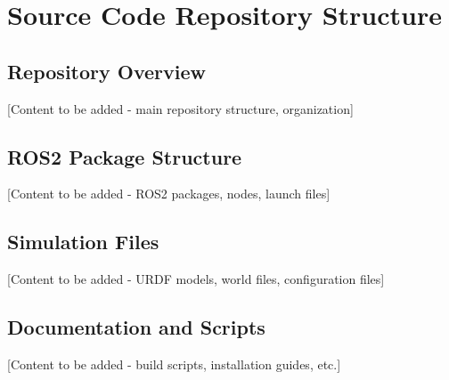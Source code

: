 
\chapter{Source Code Repository Structure}


\section{Repository Overview}

[Content to be added - main repository structure, organization]

\section{ROS2 Package Structure}

[Content to be added - ROS2 packages, nodes, launch files]

\section{Simulation Files}

[Content to be added - URDF models, world files, configuration files]

\section{Documentation and Scripts}

[Content to be added - build scripts, installation guides, etc.]
